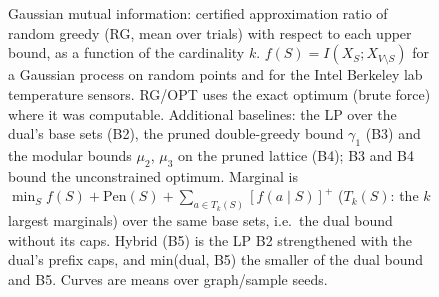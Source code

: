 \begin{figure}[t]
\centering
\setlength{\rgplotwidth}{0.49\columnwidth}
\\[1pt]
\hfill
\\

\caption{Gaussian mutual information: certified approximation ratio of random greedy (RG, mean over trials) with respect to each upper bound, as a function of the cardinality $k$. $f(S)=I(X_S;X_{V\setminus S})$ for a Gaussian process on random points and for the Intel Berkeley lab temperature sensors. RG/OPT uses the exact optimum (brute force) where it was computable. Additional baselines: the LP over the dual's base sets (B2), the pruned double-greedy bound $\gamma_1$ (B3) and the modular bounds $\mu_2$, $\mu_3$ on the pruned lattice (B4); B3 and B4 bound the unconstrained optimum. Marginal is $\min_S f(S)+\mathrm{Pen}(S)+\sum_{a\in T_k(S)}[f(a\mid S)]^+$ ($T_k(S)$: the $k$ largest marginals) over the same base sets, i.e.\ the dual bound without its caps. Hybrid (B5) is the LP B2 strengthened with the dual's prefix caps, and min(dual, B5) the smaller of the dual bound and B5. Curves are means over graph/sample seeds.}
\label{fig:rg-gaussian_mi-hybrid}
\end{figure}
